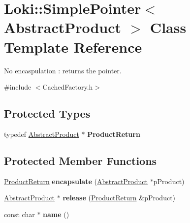 \hypertarget{classLoki_1_1SimplePointer}{}\section{Loki\+:\+:Simple\+Pointer$<$ Abstract\+Product $>$ Class Template Reference}
\label{classLoki_1_1SimplePointer}


No encaspulation \+: returns the pointer.  




{\ttfamily \#include $<$Cached\+Factory.\+h$>$}

\subsection*{Protected Types}
\begin{DoxyCompactItemize}
\item 
\hypertarget{classLoki_1_1SimplePointer_ad72820118ec610b3eda0e5257c95ef0c}{}typedef \hyperlink{classAbstractProduct}{Abstract\+Product} $\ast$ {\bfseries Product\+Return}\label{classLoki_1_1SimplePointer_ad72820118ec610b3eda0e5257c95ef0c}

\end{DoxyCompactItemize}
\subsection*{Protected Member Functions}
\begin{DoxyCompactItemize}
\item 
\hypertarget{classLoki_1_1SimplePointer_aab6efd0c413b593ab3942ba34808d228}{}\hyperlink{classAbstractProduct}{Product\+Return} {\bfseries encapsulate} (\hyperlink{classAbstractProduct}{Abstract\+Product} $\ast$p\+Product)\label{classLoki_1_1SimplePointer_aab6efd0c413b593ab3942ba34808d228}

\item 
\hypertarget{classLoki_1_1SimplePointer_a772e4bb9e48173c58b79442f7c64d62c}{}\hyperlink{classAbstractProduct}{Abstract\+Product} $\ast$ {\bfseries release} (\hyperlink{classAbstractProduct}{Product\+Return} \&p\+Product)\label{classLoki_1_1SimplePointer_a772e4bb9e48173c58b79442f7c64d62c}

\item 
\hypertarget{classLoki_1_1SimplePointer_a62b77e2b442d2d367fda4cb027bcf29d}{}const char $\ast$ {\bfseries name} ()\label{classLoki_1_1SimplePointer_a62b77e2b442d2d367fda4cb027bcf29d}

\end{DoxyCompactItemize}


